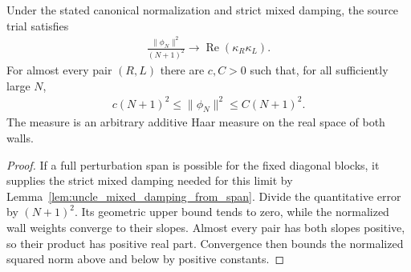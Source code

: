 \begin{lemma}
    \label{thm:uncle_trial_generic_quadratic_norm}
    \leanok
    Under the stated canonical normalization and strict mixed damping,
    the source trial satisfies
    \begin{align}
        \frac{\lVert\phi_N\rVert^2}{(N+1)^2}
        \longrightarrow\operatorname{Re}(\kappa_R\kappa_L).
    \end{align}
    For almost every pair $(R,L)$ there are $c,C>0$ such
    that, for all sufficiently large $N$,
    \begin{align}
        c(N+1)^2\le\lVert\phi_N\rVert^2\le C(N+1)^2.
    \end{align}
    The measure is an arbitrary additive Haar measure on the real space
    of both walls.
\end{lemma}
\begin{proof}
    \leanok
    If a full perturbation span is possible for the fixed diagonal
    blocks, it supplies the strict mixed damping needed for this limit
    by Lemma~\ref{lem:uncle_mixed_damping_from_span}.
    Divide the quantitative error by $(N+1)^2$. Its geometric upper bound
    tends to zero, while the normalized wall weights converge to their
    slopes. Almost every pair has both slopes positive, so their
    product has positive real part. Convergence then bounds the normalized
    squared norm above and below by positive constants.
\end{proof}

